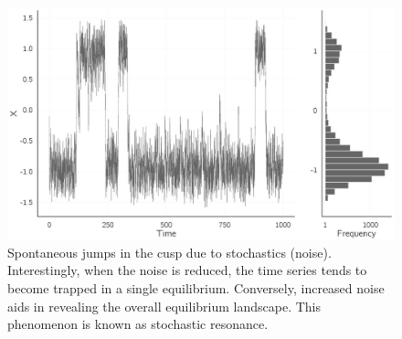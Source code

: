 \documentclass[
  a4paper,
  DIV=11,
  numbers=noendperiod]{scrreprt}
\newenvironment{Shaded}{\begin{snugshade}}{\end{snugshade}}
\newcommand{\AttributeTok}[1]{\textcolor[rgb]{0.40,0.45,0.13}{#1}}
\newcommand{\DecValTok}[1]{\textcolor[rgb]{0.68,0.00,0.00}{#1}}
\newcommand{\FunctionTok}[1]{\textcolor[rgb]{0.28,0.35,0.67}{#1}}
\newcommand{\NormalTok}[1]{\textcolor[rgb]{0.00,0.23,0.31}{#1}}
\newcommand{\OtherTok}[1]{\textcolor[rgb]{0.00,0.23,0.31}{#1}}
\newcommand{\SpecialCharTok}[1]{\textcolor[rgb]{0.37,0.37,0.37}{#1}}
\newcommand{\StringTok}[1]{\textcolor[rgb]{0.13,0.47,0.30}{#1}}
\begin{document}
\begin{Shaded}
\end{Shaded}

\begin{figure}

{\centering \includegraphics{media/ch4n/fig-ch4n-img2-old-50.jpg}

}

\caption{\label{fig-ch4n-img2-old-50}Spontaneous jumps in the cusp due
to stochastics (noise). Interestingly, when the noise is reduced, the
time series tends to become trapped in a single equilibrium. Conversely,
increased noise aids in revealing the overall equilibrium landscape.
This phenomenon is known as stochastic resonance.}

\end{figure}
\end{document}
